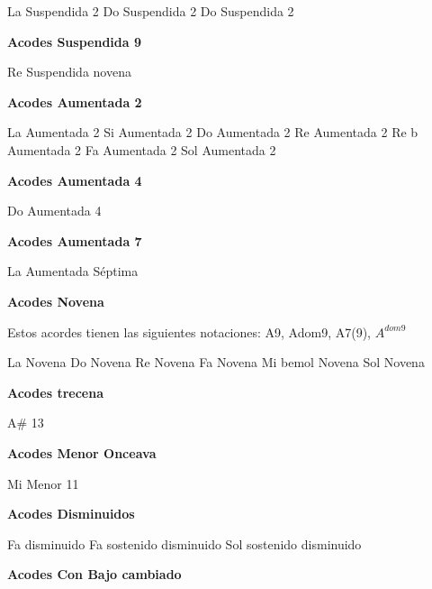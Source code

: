 \small
\upchord{\AsustwoPiano}La Suspendida 2
\upchord{\CsustwoPiano}Do Suspendida 2
\upchord{\DsustwoPiano}Do Suspendida 2
\normalsize

\vskip 20pt
\textbf{Acodes Suspendida 9}
\vskip 25pt

\small
\upchord{\DsusninePiano}Re Suspendida novena
\normalsize

\vskip 20pt
\textbf{Acodes Aumentada 2}
\vskip 25pt

\small
\upchord{\AtwoPiano}La Aumentada 2 \hfill
\upchord{\BtwoPiano}Si Aumentada 2 \hfill
\upchord{\CtwoPiano}Do Aumentada 2 \hfill\null\break
\vskip 20pt
\upchord{\DtwoPiano}Re Aumentada 2 \hfill
\upchord{\EflattwoPiano}Re b Aumentada 2 \hfill
\upchord{\FtwoPiano}Fa Aumentada 2 \hfill\null\break
\vskip 20pt
\upchord{\GtwoPiano}Sol Aumentada 2 \hfill\null\break
\normalsize

\vskip 20pt
\textbf{Acodes Aumentada 4}
\vskip 25pt

\small
\upchord{\CfourPiano}Do Aumentada 4 \hfill\null\break
\normalsize

\vskip 20pt
\textbf{Acodes Aumentada 7}
\vskip 25pt

\small
\upchord{\AaugsevenPiano}La Aumentada S\'eptima \hfill\null\break
\normalsize


\vskip 20pt
\textbf{Acodes Novena}
\vskip 25pt

Estos acordes tienen las siguientes notaciones:
A9, Adom9, A7(9), $A^{dom9}$\break
\vskip 20pt

\small
\upchord{\AninePiano}La Novena \hfill
\upchord{\CninePiano}Do Novena \hfill
\upchord{\DninePiano}Re Novena \hfill\null\break
\vskip 20pt
\upchord{\FninePiano}Fa Novena \hfill
\upchord{\EflatninePiano}Mi bemol Novena \hfill
\upchord{\GninePiano}Sol Novena \hfill\null\break
\normalsize

\vskip 20pt
\textbf{Acodes trecena}
\vskip 25pt

\small
\upchord{\AsthirteenPiano}A\# 13
\normalsize

\vskip 20pt
\textbf{Acodes Menor Onceava}
\vskip 25pt

\small
\upchord{\EmelevenPiano}Mi Menor 11
\normalsize

\textbf{Acodes Disminuidos}
\vskip 25pt

\small
\upchord{\FdimPiano}Fa disminuido\hfill
\upchord{\FsdimPiano}Fa sostenido disminuido\hfill
\upchord{\GsdimPiano}Sol sostenido disminuido\hfill\null\break
\normalsize


\vskip 20pt
\textbf{Acodes Con Bajo cambiado}
\vskip 25pt

